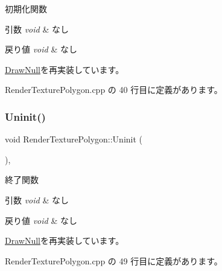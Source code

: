 初期化関数 


\begin{DoxyParams}{引数}
{\em void} & なし \\
\hline
\end{DoxyParams}

\begin{DoxyRetVals}{戻り値}
{\em void} & なし \\
\hline
\end{DoxyRetVals}


\mbox{\hyperlink{class_draw_null_a20aef1e54c1a158b741bfd731e18efdf}{Draw\+Null}}を再実装しています。



 Render\+Texture\+Polygon.\+cpp の 40 行目に定義があります。

\mbox{\label{class_render_texture_polygon_a3ff2fc37bb953074a5ab8a0dde7aaa1c}} 
\subsubsection{\texorpdfstring{Uninit()}{Uninit()}}
{\footnotesize\ttfamily void Render\+Texture\+Polygon\+::\+Uninit (\begin{DoxyParamCaption}{ }\end{DoxyParamCaption})\hspace{0.3cm}{\ttfamily [override]}, {\ttfamily [virtual]}}



終了関数 


\begin{DoxyParams}{引数}
{\em void} & なし \\
\hline
\end{DoxyParams}

\begin{DoxyRetVals}{戻り値}
{\em void} & なし \\
\hline
\end{DoxyRetVals}


\mbox{\hyperlink{class_draw_null_a6e81d63efab7333e8d0e8af99362a4d9}{Draw\+Null}}を再実装しています。



 Render\+Texture\+Polygon.\+cpp の 49 行目に定義があります。

\mbox{\label{class_render_texture_polygon_aacbc16dd7ed1117533728d68dcfeb154}} 
